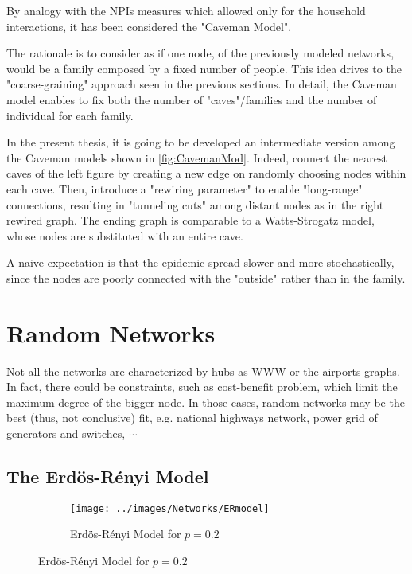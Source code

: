 \documentclass[a4paper,10pt,twoside]{book} %
\theoremstyle{definition}
\begin{document}
By analogy with the NPIs measures which allowed only for the household interactions, it has been considered the "Caveman Model".

The rationale is to consider as if one node, of the previously modeled networks, would be a family composed by a fixed number of people. This idea drives to the "coarse-graining" approach seen in the previous sections.
In detail, the Caveman model enables to fix both the number of "caves"/families and the number of individual for each family. 

In the present thesis, it is going to be developed an intermediate version among the Caveman models shown in \autoref{fig:CavemanMod}. Indeed, connect the nearest caves of the left figure by creating a new edge on randomly choosing nodes within each cave. Then, introduce a "rewiring parameter" to enable "long-range" connections, resulting in "tunneling cuts" among distant nodes as in the right rewired graph. The ending graph is comparable to a Watts-Strogatz model, whose nodes are substituted with an entire cave.

A naive expectation is that the epidemic spread slower and more stochastically, since the nodes are poorly connected with the "outside" rather than in the family.

\section{Random Networks}
Not all the networks are characterized by hubs as WWW or the airports graphs.
In fact, there could be constraints, such as cost-benefit problem, which limit the maximum degree of the bigger node. In those cases, random networks may be the best (thus, not conclusive) fit, e.g. national highways network, power grid of generators and switches, $\cdots$

\subsection{The Erdös-Rényi Model}

\begin{figure}[ht]
    \begin{subfigure}{\textwidth}
        \texttt{[image: ../images/Networks/ERmodel]}
        \centering
        \caption{Erdös-Rényi Model for $p = 0.2$ \cite{Baronchelli:2017_EpidSpreadCompNets}}
        \label{fig:ERmodel}
    \end{subfigure}
\end{figure}
\end{document}
